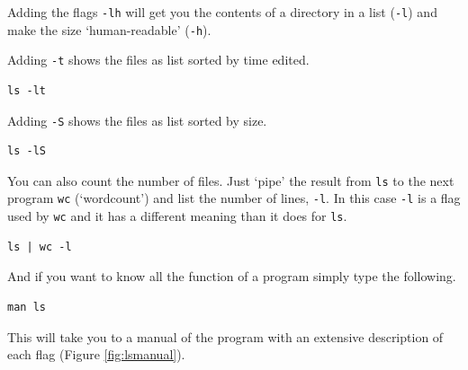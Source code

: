 \documentclass[
]{book}
\newcommand{\passthrough}[1]{#1}
\begin{document}
Adding the flags \passthrough{\lstinline!-lh!} will get you the contents of a directory in a list (\passthrough{\lstinline!-l!}) and make the size `human-readable' (\passthrough{\lstinline!-h!}).

Adding \passthrough{\lstinline!-t!} shows the files as list sorted by time edited.

\begin{lstlisting}
ls -lt 
\end{lstlisting}

Adding \passthrough{\lstinline!-S!} shows the files as list sorted by size.

\begin{lstlisting}
ls -lS 
\end{lstlisting}

You can also count the number of files. Just `pipe' the result from \passthrough{\lstinline!ls!} to the next program \passthrough{\lstinline!wc!} (`wordcount') and list the number of lines, \passthrough{\lstinline!-l!}. In this case \passthrough{\lstinline!-l!} is a flag used by \passthrough{\lstinline!wc!} and it has a different meaning than it does for \passthrough{\lstinline!ls!}.

\begin{lstlisting}
ls | wc -l
\end{lstlisting}

And if you want to know all the function of a program simply type the following.

\begin{lstlisting}
man ls
\end{lstlisting}

This will take you to a manual of the program with an extensive description of each flag (Figure \ref{fig:lsmanual}).
\end{document}
